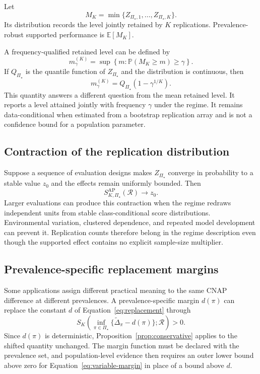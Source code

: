 \documentclass[11pt]{article}
\newcommand{\Regime}{\mathcal{R}}
\newcommand{\PSet}{\Pi_\star}
\newcommand{\E}{\mathbb{E}}
\newcommand{\Prb}{\mathbb{P}}
\newcommand{\Dta}{\widetilde{\Delta}}
\theoremstyle{remark}
\begin{document}
Let
\[
M_K
=
\min\{Z_{\PSet,1},\ldots,Z_{\PSet,K}\}.
\]
Its distribution records the level jointly retained by $K$ replications. Prevalence-robust supported performance is $\E[M_K]$.

A frequency-qualified retained level can be defined by
\[
m_\gamma^{(K)}
=
\sup
\left\{
m:
\Prb(M_K\geq m)\geq\gamma
\right\}.
\]
If $Q_{\PSet}$ is the quantile function of $Z_{\PSet}$ and the distribution is continuous, then
\begin{equation}
m_\gamma^{(K)}
=
Q_{\PSet}\left(1-\gamma^{1/K}\right).
\label{eq:frequency-level}
\end{equation}
This quantity answers a different question from the mean retained level. It reports a level attained jointly with frequency $\gamma$ under the regime. It remains data-conditional when estimated from a bootstrap replication array and is not a confidence bound for a population parameter.

\subsection{Contraction of the replication distribution}

Suppose a sequence of evaluation designs makes $Z_{\PSet}$ converge in probability to a stable value $z_0$ and the effects remain uniformly bounded. Then
\[
S_{K,\PSet}^{\mathrm{AP}}(\Regime)
\longrightarrow
z_0.
\]
Larger evaluations can produce this contraction when the regime redraws independent units from stable class-conditional score distributions. Environmental variation, clustered dependence, and repeated model development can prevent it. Replication counts therefore belong in the regime description even though the supported effect contains no explicit sample-size multiplier.

\subsection{Prevalence-specific replacement margins}
\label{app:variable-margin}

Some applications assign different practical meaning to the same CNAP difference at different prevalences. A prevalence-specific margin $d(\pi)$ can replace the constant $d$ of Equation~\eqref{eq:replacement} through
\begin{equation}
S_K\left(
\inf_{\pi\in\PSet}
\{\Dta_\pi-d(\pi)\};
\Regime
\right)>0.
\label{eq:variable-margin}
\end{equation}
Since $d(\pi)$ is deterministic, Proposition~\ref{prop:conservative} applies to the shifted quantity unchanged. The margin function must be declared with the prevalence set, and population-level evidence then requires an outer lower bound above zero for Equation~\eqref{eq:variable-margin} in place of a bound above $d$.
\end{document}

